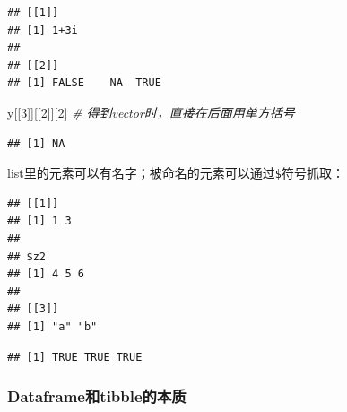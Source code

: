 \documentclass[]{book}
\newenvironment{Shaded}{\begin{snugshade}}{\end{snugshade}}
\newcommand{\CommentTok}[1]{\textcolor[rgb]{0.56,0.35,0.01}{\textit{#1}}}
\newcommand{\DataTypeTok}[1]{\textcolor[rgb]{0.13,0.29,0.53}{#1}}
\newcommand{\DecValTok}[1]{\textcolor[rgb]{0.00,0.00,0.81}{#1}}
\newcommand{\KeywordTok}[1]{\textcolor[rgb]{0.13,0.29,0.53}{\textbf{#1}}}
\newcommand{\NormalTok}[1]{#1}
\newcommand{\OperatorTok}[1]{\textcolor[rgb]{0.81,0.36,0.00}{\textbf{#1}}}
\newcommand{\StringTok}[1]{\textcolor[rgb]{0.31,0.60,0.02}{#1}}
\begin{document}
\begin{verbatim}
## [[1]]
## [1] 1+3i
## 
## [[2]]
## [1] FALSE    NA  TRUE
\end{verbatim}

\begin{Shaded}
\begin{Highlighting}[]
\NormalTok{y[[}\DecValTok{3}\NormalTok{]][[}\DecValTok{2}\NormalTok{]][}\DecValTok{2}\NormalTok{] }\CommentTok{# 得到vector时，直接在后面用单方括号}
\end{Highlighting}
\end{Shaded}

\begin{verbatim}
## [1] NA
\end{verbatim}

list里的元素可以有名字；被命名的元素可以通过\texttt{\$}符号抓取：

\begin{Shaded}
\end{Shaded}

\begin{verbatim}
## [[1]]
## [1] 1 3
## 
## $z2
## [1] 4 5 6
## 
## [[3]]
## [1] "a" "b"
\end{verbatim}

\begin{Shaded}
\end{Shaded}

\begin{verbatim}
## [1] TRUE TRUE TRUE
\end{verbatim}

\hypertarget{dataframetibble}{%
\subsubsection{Dataframe和tibble的本质}\label{dataframetibble}}
\end{document}
